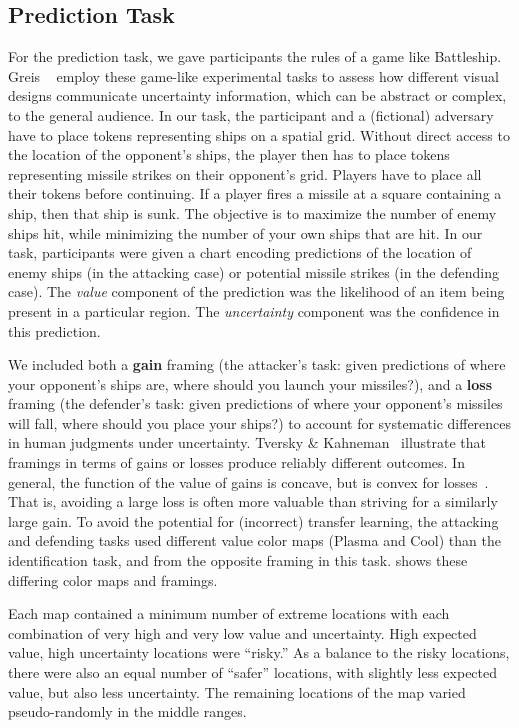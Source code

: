 \subsection{Prediction Task}

\taskTwoFig

For the prediction task, we gave participants the rules of a game like Battleship. Greis \ea~\cite{greis2016decision} employ these game-like experimental tasks to assess how different visual designs communicate uncertainty information, which can be abstract or complex, to the general audience. In our task, the participant and a (fictional) adversary have to place tokens representing ships on a spatial grid. Without direct access to the location of the opponent's ships, the player then has to place tokens representing missile strikes on their opponent's grid. Players have to place all their tokens before continuing. If a player fires a missile at a square containing a ship, then that ship is sunk. The objective is to maximize the number of enemy ships hit, while minimizing the number of your own ships that are hit. In our task, participants were given a chart encoding predictions of the location of enemy ships (in the attacking case) or potential missile strikes (in the defending case). The \emph{value} component of the prediction was the likelihood of an item being present in a particular region. The \emph{uncertainty} component was the confidence in this prediction.

We included both a \textbf{gain} framing (the attacker's task: given predictions of where your opponent's ships are, where should you launch your missiles?), and a \textbf{loss} framing (the defender's task: given predictions of where your opponent's missiles will fall, where should you place your ships?) to account for systematic differences in human judgments under uncertainty. Tversky \& Kahneman~\cite{tversky1985framing} illustrate that framings in terms of gains or losses produce reliably different outcomes. In general, the function of the value of gains is concave, but is convex for losses~\cite{kahneman1979prospect}. That is, avoiding a large loss is often more valuable than striving for a similarly large gain. To avoid the potential for (incorrect) transfer learning, the attacking and defending tasks used different value color maps (Plasma and Cool) than the identification task, and from the opposite framing in this task.  shows these differing color maps and framings.

Each map contained a minimum number of extreme locations with each combination of very high and very low value and uncertainty. High expected value, high uncertainty locations were ``risky.'' As a balance to the risky locations, there were also an equal number of ``safer'' locations, with slightly less expected value, but also less uncertainty. The remaining locations of the map varied pseudo-randomly in the middle ranges.

